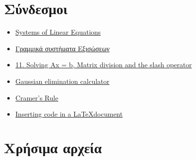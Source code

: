 \documentclass[14pt]{extreport}
\begin{document}
\section{Σύνδεσμοι}
\begin{itemize}
    \item \href{http://sites.science.oregonstate.edu/math/home/programs/undergrad/CalculusQuestStudyGuides/vcalc/system/system.html}{Systems of Linear Equations}
    \item \href{http://esperia.iesl.forth.gr/~kafesaki/Applied-Mathematics/linear-algebra/linear-systems.pdf}{Γραμμικά συστήματα Εξισώσεων}
    \item \href{http://www-h.eng.cam.ac.uk/help/programs/octave/tutorial/}{11. Solving Ax = b, Matrix division and the slash operator}
    \item \href{https://onlinemschool.com/math/assistance/equation/gaus/}{Gaussian elimination calculator}
    \item \href{http://www.matrixlab-examples.com/cramers-rule.html}{Cramer's Rule}
    \item \href{https://pt.overleaf.com/learn/latex/Code_listing}{Inserting code in a \LaTeX document}
\end{itemize}
\section{Χρήσιμα αρχεία}
\end{document}

